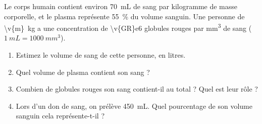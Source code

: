 Le corps humain contient environ \qty{70}{mL} de sang par kilogramme de masse corporelle, et le plasma représente \qty{55}{\percent} du volume sanguin. Une personne de \qty{\v{m}}{kg} a une concentration de \num{\v{GR}e6} globules rouges par \unit{mm^3} de sang ($\qty{1}{mL} = \qty{1000}{mm^3}$).

\begin{enumerate}[label=\alph*)]
    \item Estimez le volume de sang de cette personne, en litres.
    \item Quel volume de plasma contient son sang ?
    \item Combien de globules rouges son sang contient-il au total ? Quel est leur rôle ?
    \item Lors d'un don de sang, on prélève \qty{450}{mL}. Quel pourcentage de son volume sanguin cela représente-t-il ?
\end{enumerate}
